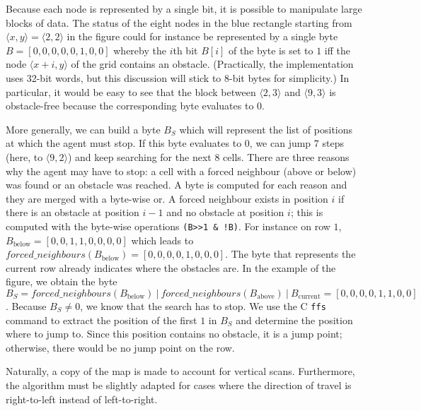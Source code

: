 Because each node is represented by a single bit, 
it is possible to manipulate large blocks of data.  
The status of the eight nodes in the blue rectangle 
starting from $\langle x,y\rangle = \langle 2,2\rangle$ in the figure 
could for instance be represented by a single byte 
$B = [0,0,0,0,0,1,0,0]$ 
whereby the $i$th bit $B[i]$ of the byte is set to $1$ 
iff the node $\langle x+i,y\rangle$ of the grid contains an obstacle.  
(Practically, the implementation uses 32-bit words, 
but this discussion will stick to 8-bit bytes for simplicity.)
In particular, it would be easy to see that the block 
between $\langle 2,3\rangle$ and $\langle 9,3\rangle$ 
is obstacle-free because the corresponding byte evaluates to $0$.  

More generally, we can build a byte $B_S$ 
which will represent the list of positions 
at which the agent must stop.  
If this byte evaluates to $0$, 
we can jump $7$ steps (here, to $\langle 9,2\rangle$) 
and keep searching for the next $8$ cells.  
There are three reasons why the agent may have to stop: 
a cell with a forced neighbour (above or below) was found 
or an obstacle was reached.  
A byte is computed for each reason 
and they are merged with a byte-wise or.  
A forced neighbour exists in position $i$ 
if there is an obstacle at position $i-1$ 
and no obstacle at position $i$; 
this is computed with the byte-wise operations \texttt{(B>>1\ \& !B)}.  
For instance on row $1$, $B_{\mathrm{below}} = [0,0,1,1,0,0,0,0]$ 
which leads to 
$\mathit{forced\_neighbours}(B_{\mathrm{below}}) = [0,0,0,0,1,0,0,0]$.  
The byte that represents the current row already indicates 
where the obstacles are.  
In the example of the figure, 
we obtain the byte $B_S = 
\mathit{forced\_neighbours}(B_{\mathrm{below}})\ |\ 
\mathit{forced\_neighbours}(B_{\mathrm{above}})\ |\ 
B_{\mathrm{current}}
= [0,0,0,0,1,1,0,0]$.  
Because $B_S \neq 0$, 
we know that the search has to stop.  
We use the C \texttt{ffs} command 
to extract the position of the first $1$ in $B_S$ 
and determine the position where to jump to.  
Since this position contains no obstacle, 
it is a jump point; 
otherwise, there would be no jump point on the row.  

Naturally, a copy of the map is made to account for vertical scans.  
Furthermore, the algorithm must be slightly adapted 
for cases where the direction of travel is right-to-left 
instead of left-to-right.  



